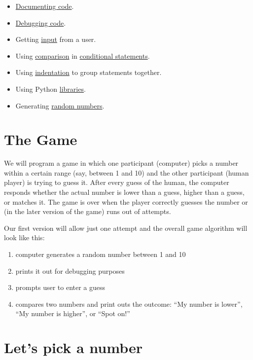 \documentclass[
]{book}
\providecommand{\tightlist}{%
  \setlength{\itemsep}{0pt}\setlength{\parskip}{0pt}}
\begin{document}
\begin{itemize}
\tightlist
\item
  \protect\hyperlink{documenting-your-code}{Documenting code}.
\item
  \protect\hyperlink{debugging}{Debugging code}.
\item
  Getting \protect\hyperlink{input-function}{input} from a user.
\item
  Using \protect\hyperlink{comparisons}{comparison} in \protect\hyperlink{if-statement}{conditional statements}.
\item
  Using \protect\hyperlink{indentation}{indentation} to group statements together.
\item
  Using Python \protect\hyperlink{using-libraries}{libraries}.
\item
  Generating \protect\hyperlink{picking-a-number-randomly}{random numbers}.
\end{itemize}

\hypertarget{the-game}{%
\section{The Game}\label{the-game}}

We will program a game in which one participant (computer) picks a number within a certain range (say, between 1 and 10) and the other participant (human player) is trying to guess it. After every guess of the human, the computer responds whether the actual number is lower than a guess, higher than a guess, or matches it. The game is over when the player correctly guesses the number or (in the later version of the game) runs out of attempts.

Our first version will allow just one attempt and the overall game algorithm will look like this:

\begin{enumerate}
\def\labelenumi{\arabic{enumi}.}
\tightlist
\item
  computer generates a random number between 1 and 10
\item
  prints it out for debugging purposes
\item
  prompts user to enter a guess
\item
  compares two numbers and print outs the outcome: ``My number is lower'', ``My number is higher'', or ``Spot on!''
\end{enumerate}

\hypertarget{lets-pick-a-number}{%
\section{Let's pick a number}\label{lets-pick-a-number}}
\end{document}
